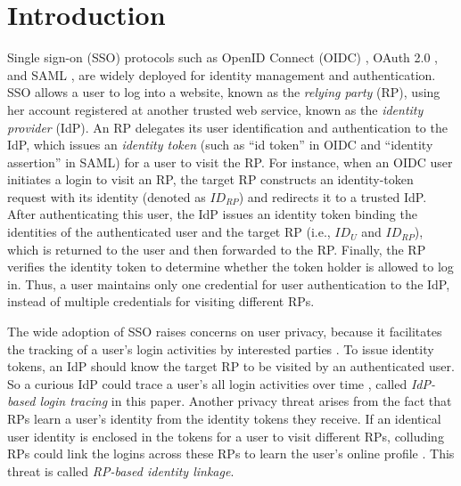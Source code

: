 \section{Introduction}
\label{sec:intro}
Single sign-on (SSO) protocols such as OpenID Connect (OIDC) \cite{OpenIDConnect}, OAuth 2.0 \cite{rfc6749}, and SAML \cite{SAML, SAMLIdentifier}, are widely deployed for identity management and authentication.
SSO allows a user to log into a website,
 known as the \emph{relying party} (RP), using her account registered at another trusted web service, known as the \emph{identity provider} (IdP).
An RP delegates its user identification and authentication to the IdP, which issues an \emph{identity token} (such as ``id token'' in OIDC and ``identity assertion'' in SAML) for a user to visit the RP.
For instance, when an OIDC user initiates a login to visit an RP,
the target RP constructs an identity-token request with its identity (denoted as $ID_{RP}$) and redirects it to a trusted IdP.
After authenticating this user, the IdP issues an identity token binding the identities of the authenticated user and the target RP (i.e., $ID_U$ and $ID_{RP}$), which is returned to the user and then forwarded to the RP.
Finally, the RP verifies the identity token to determine whether the token holder is allowed to log in. Thus, a user maintains only one credential for user authentication to the IdP, instead of multiple credentials for visiting different RPs.


The wide adoption of SSO raises concerns on user privacy, because it facilitates the tracking of a user's login activities by interested parties \cite{NIST2017draft, SPRESSO, BrowserID, maler2008venn}.
To issue identity tokens, an IdP should know the target RP to be visited by an authenticated user.
So a curious IdP could trace a user's all login activities over time
 \cite{BrowserID, SPRESSO},
called {\em IdP-based login tracing} in this paper.
Another privacy threat arises from the fact that RPs learn a user's identity from the identity tokens they receive.
If an identical user identity is enclosed in the tokens for a user to visit different RPs, colluding RPs could link the logins across these RPs %
to learn the user's online profile \cite{maler2008venn, FirefoxAccount}.
This threat is called {\em RP-based identity linkage}. %

